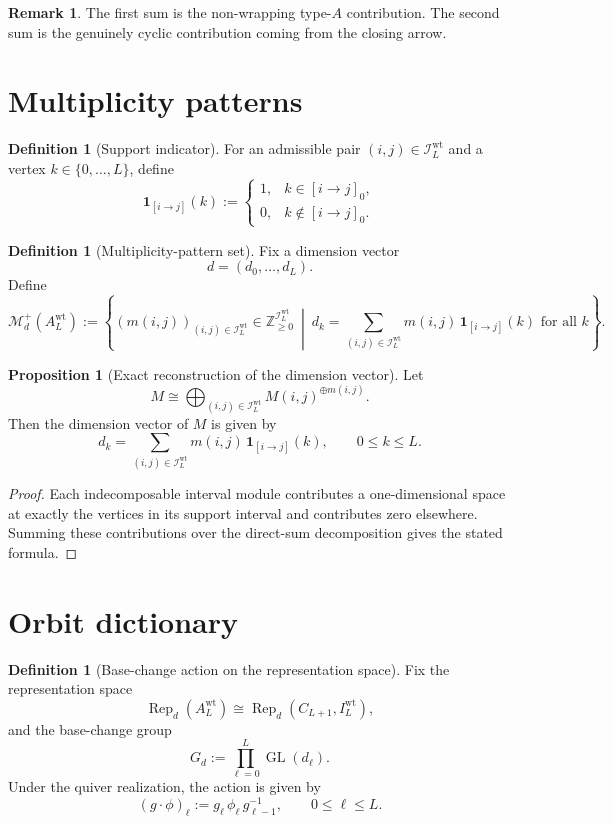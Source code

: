 \documentclass{article}
\newcommand{\GL}{\operatorname{GL}}
\newcommand{\Rep}{\operatorname{Rep}}
\theoremstyle{definition}
\newtheorem{proposition}[theorem]{Proposition}
\newtheorem{definition}[theorem]{Definition}
\newtheorem{remark}[theorem]{Remark}
\begin{document}
\begin{remark}
The first sum is the non-wrapping type-$A$ contribution.
The second sum is the genuinely cyclic contribution coming from the closing
arrow.
\end{remark}

\section{Multiplicity patterns}

\begin{definition}[Support indicator]
For an admissible pair $(i,j)\in \mathcal I_L^{\mathrm{wt}}$ and a vertex
$k\in\{0,\dots,L\}$, define
\[
\mathbf 1_{[i\to j]}(k)
:=
\begin{cases}
1, & k\in [i\to j]_0,\\
0, & k\notin [i\to j]_0.
\end{cases}
\]
\end{definition}

\begin{definition}[Multiplicity-pattern set]
Fix a dimension vector
\[
d=(d_0,\dots,d_L).
\]
Define
\[
\mathcal M_d^+(A_L^{\mathrm{wt}})
:=
\left\{
(m(i,j))_{(i,j)\in \mathcal I_L^{\mathrm{wt}}}
\in
\mathbb Z_{\ge 0}^{\mathcal I_L^{\mathrm{wt}}}
\ \middle|\
d_k=
\sum_{(i,j)\in \mathcal I_L^{\mathrm{wt}}}
m(i,j)\,\mathbf 1_{[i\to j]}(k)
\text{ for all }k
\right\}.
\]
\end{definition}

\begin{proposition}[Exact reconstruction of the dimension vector]
Let
\[
M
\cong
\bigoplus_{(i,j)\in \mathcal I_L^{\mathrm{wt}}}
M(i,j)^{\oplus m(i,j)}.
\]
Then the dimension vector of $M$ is given by
\[
d_k=
\sum_{(i,j)\in \mathcal I_L^{\mathrm{wt}}}
m(i,j)\,\mathbf 1_{[i\to j]}(k),
\qquad
0\le k\le L.
\]
\end{proposition}

\begin{proof}
Each indecomposable interval module contributes a one-dimensional space at
exactly the vertices in its support interval and contributes zero elsewhere.
Summing these contributions over the direct-sum decomposition gives the stated
formula.
\end{proof}

\section{Orbit dictionary}

\begin{definition}[Base-change action on the representation space]
Fix the representation space
\[
\Rep_d(A_L^{\mathrm{wt}})
\cong
\Rep_d(C_{L+1},I_L^{\mathrm{wt}}),
\]
and the base-change group
\[
G_d:=\prod_{\ell=0}^L \GL(d_\ell).
\]
Under the quiver realization, the action is given by
\[
(g\cdot \phi)_\ell:=g_\ell\,\phi_\ell\,g_{\ell-1}^{-1},
\qquad
0\le \ell\le L.
\]
\end{definition}
\end{document}
